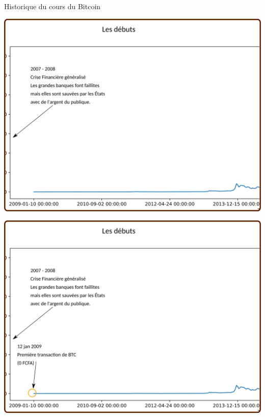 \documentclass[presentation]{beamer}
\begin{document}
\begin{frame}[label={sec:org6ff9387}]{Historique du cours du Bitcoin}
\begin{block}{}
\begin{center}
\includegraphics[width=.95\textwidth]{./Pictures/Timeline/00debut0.png}
\end{center}
\end{block}
\begin{block}{}
\begin{center}
\includegraphics[width=.95\textwidth]{./Pictures/Timeline/01debut_prix_crea.png}
\end{center}
\end{block}


\end{frame}
\end{document}
